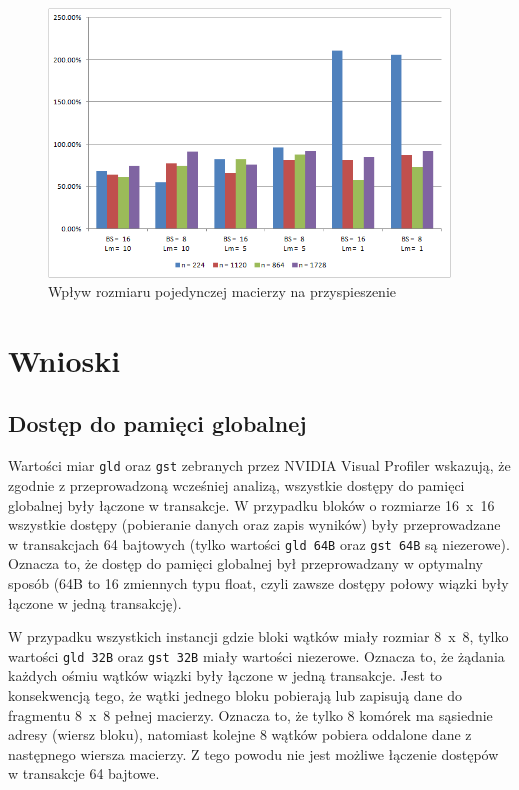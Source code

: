 \documentclass[12pt,a4paper]{article}
\begin{document}
\begin{figure}[H]
  \centering
    \includegraphics[width=0.95\textwidth]{charts/MatrixSize.png}
    \caption{Wpływ rozmiaru pojedynczej macierzy na przyspieszenie}
    \label{chart:MatrixSize}
\end{figure}


\section{Wnioski}

\subsection{Dostęp do pamięci globalnej}

Wartości miar \verb|gld| oraz \verb|gst| zebranych przez NVIDIA Visual Profiler wskazują, że zgodnie z przeprowadzoną wcześniej analizą, wszystkie dostępy do pamięci globalnej były łączone w transakcje. W przypadku bloków o rozmiarze 16~x~16 wszystkie dostępy (pobieranie danych oraz zapis wyników) były przeprowadzane w transakcjach 64 bajtowych (tylko wartości \verb|gld 64B| oraz \verb|gst 64B| są niezerowe). Oznacza to, że dostęp do pamięci globalnej był przeprowadzany w optymalny sposób (64B to 16 zmiennych typu float, czyli zawsze dostępy połowy wiązki były łączone w jedną transakcję).

W przypadku wszystkich instancji gdzie bloki wątków miały rozmiar 8~x~8, tylko wartości \verb|gld 32B| oraz \verb|gst 32B| miały wartości niezerowe. Oznacza to, że żądania każdych ośmiu wątków wiązki były łączone w jedną transakcje. Jest to konsekwencją tego, że wątki jednego bloku pobierają lub zapisują dane do fragmentu 8~x~8 pełnej macierzy. Oznacza to, że tylko 8 komórek ma sąsiednie adresy (wiersz bloku), natomiast kolejne 8 wątków pobiera oddalone dane z następnego wiersza macierzy. Z tego powodu nie jest możliwe łączenie dostępów w transakcje 64 bajtowe.
\end{document}
